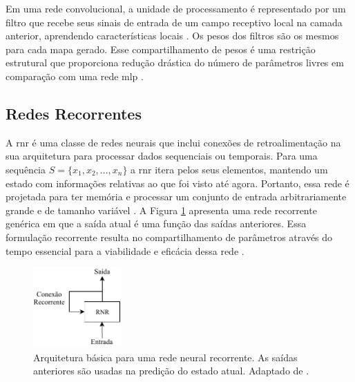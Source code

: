 Em uma rede convolucional, a unidade de processamento é representado por um filtro que recebe seus sinais de entrada de um campo receptivo local na camada anterior, aprendendo características locais \cite[272]{Haykin}. Os pesos dos filtros são os mesmos para cada mapa gerado. Esse compartilhamento de pesos é uma restrição estrutural que proporciona redução drástica do número de parâmetros livres em comparação com uma rede \acrshort{mlp} \cite[272]{Haykin}. 




\subsection{Redes Recorrentes}

A \gls{rnr} \cite{rumelhart1986learning} é uma classe de redes neurais que inclui conexões de retroalimentação na sua arquitetura para processar dados sequenciais ou temporais. Para uma sequência $S = \{x_1,x_2,...,x_n\}$ a \acrshort{rnr} itera pelos seus elementos, mantendo um estado com informações relativas ao que foi visto até agora. Portanto, essa rede é projetada para ter memória \cite{FrancoisDeepLearning} e processar um conjunto de entrada arbitrariamente grande e de tamanho variável \cite{ketkar2017deep}.
A Figura \ref{fig:rnr} apresenta uma rede recorrente genérica em que a saída atual é uma função das saídas anteriores.  Essa formulação recorrente resulta no compartilhamento de parâmetros através do tempo essencial para a viabilidade e eficácia dessa rede \cite{Goodfellow2016}.

\begin{figure}[h]
	\centering
	\includegraphics[width=0.3\textwidth]{figuras/rnn.pdf}
	\caption[Arquitetura RNR.]{Arquitetura básica para uma rede neural recorrente. As saídas anteriores são usadas na predição do estado atual. Adaptado de \cite{FrancoisDeepLearning}.}
	\label{fig:rnr}
\end{figure}

